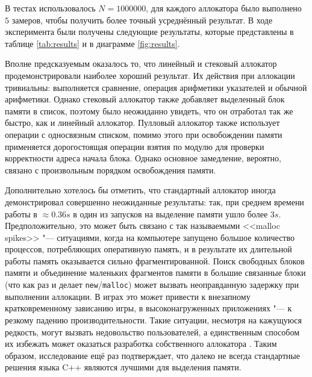 В тестах использовалось $N = 1000000$, для каждого аллокатора было выполнено $5$ замеров, чтобы получить более точный усреднённый результат. В ходе эксперимента были получены следующие результаты, которые представлены в таблице \ref{tab:results} и в диаграмме \ref{fig:results}.

\small

\normalsize


Вполне предсказуемым оказалось то, что линейный и стековый аллокатор продемонстрировали наиболее хороший результат. Их действия при аллокации тривиальны: выполняется сравнение, операция арифметики указателей и обычной арифметики. Однако стековый аллокатор также добавляет выделенный блок памяти в список, поэтому было неожиданно увидеть, что он отработал так же быстро, как и линейный аллокатор. Пулловый аллокатор также использует операции с односвязным списком, помимо этого при освобождении памяти применяется дорогостоящая операции взятия по модулю для проверки корректности адреса начала блока. Однако основное замедление, вероятно, связано с произвольным порядком освобождения памяти.

Дополнительно хотелось бы отметить, что стандартный аллокатор иногда демонстрировал совершенно неожиданные результаты: так, при среднем времени работы в $\approx 0.36s$ в один из запусков на выделение памяти ушло более $3s$. Предположительно, это может быть связано с так называемыми <<malloc spikes>> "--- ситуациями, когда на компьютере запущено большое количество процессов, потребляющих оперативную память, и в результате их длительной работы память оказывается сильно фрагментированной. Поиск свободных блоков памяти и объединение маленьких фрагментов памяти в большие связанные блоки (что как раз и делает \texttt{new}/\texttt{malloc}) может вызвать неоправданную задержку при выполнении аллокации. В играх это может привести к внезапному кратковременному зависанию игры, в высоконагруженных приложениях "--- к резкому падению производительности. Такие ситуации, несмотря на кажущуюся редкость, могут вызвать недовольство пользователей, а единственным способом их избежать может оказаться разработка собственного аллокатора \cite{pre-allocation}. Таким образом, исследование ещё раз подтверждает, что далеко не всегда стандартные решения языка C++ являются лучшими для выделения памяти.
